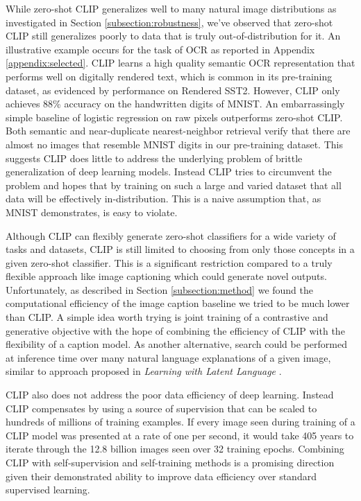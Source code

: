 \documentclass{article}
\begin{document}
While zero-shot CLIP generalizes well to many natural image distributions as investigated in Section \ref{subsection:robustness}, we've observed that zero-shot CLIP still generalizes poorly to data that is truly out-of-distribution for it. An illustrative example occurs for the task of OCR as reported in Appendix \ref{appendix:selected}. CLIP learns a high quality semantic OCR representation that performs well on digitally rendered text, which is common in its pre-training dataset, as evidenced by performance on Rendered SST2. However, CLIP only achieves 88\% accuracy on the handwritten digits of MNIST. An embarrassingly simple baseline of logistic regression on raw pixels outperforms zero-shot CLIP. Both semantic and near-duplicate nearest-neighbor retrieval verify that there are almost no images that resemble MNIST digits in our pre-training dataset. This suggests CLIP does little to address the underlying problem of brittle generalization of deep learning models. Instead CLIP tries to circumvent the problem and hopes that by training on such a large and varied dataset that all data will be effectively in-distribution. This is a naive assumption that, as MNIST demonstrates, is easy to violate.

Although CLIP can flexibly generate zero-shot classifiers for a wide variety of tasks and datasets, CLIP is still limited to choosing from only those concepts in a given zero-shot classifier. This is a significant restriction compared to a truly flexible approach like image captioning which could generate novel outputs. Unfortunately, as described in Section \ref{subsection:method} we found the computational efficiency of the image caption baseline we tried to be much lower than CLIP. A simple idea worth trying is joint training of a contrastive and generative objective with the hope of combining the efficiency of CLIP with the flexibility of a caption model. As another alternative, search could be performed at inference time over many natural language explanations of a given image, similar to approach proposed in \textit{Learning with Latent Language} \citet{andreas2017learning}.

CLIP also does not address the poor data efficiency of deep learning. Instead CLIP compensates by using a source of supervision that can be scaled to hundreds of millions of training examples. If every image seen during training of a CLIP model was presented at a rate of one per second, it would take 405 years to iterate through the 12.8 billion images seen over 32 training epochs. Combining CLIP with self-supervision \citep{henaff2020data,chen2020big} and self-training \citep{lee2013pseudo,xie2020self} methods is a promising direction given their demonstrated ability to improve data efficiency over standard supervised learning.
\end{document}
